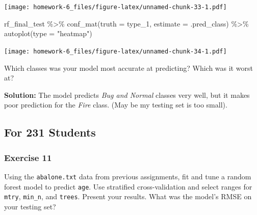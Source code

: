 \documentclass[
]{article}
\newenvironment{Shaded}{\begin{snugshade}}{\end{snugshade}}
\newcommand{\AttributeTok}[1]{\textcolor[rgb]{0.77,0.63,0.00}{#1}}
\newcommand{\FunctionTok}[1]{\textcolor[rgb]{0.00,0.00,0.00}{#1}}
\newcommand{\NormalTok}[1]{#1}
\newcommand{\SpecialCharTok}[1]{\textcolor[rgb]{0.00,0.00,0.00}{#1}}
\newcommand{\StringTok}[1]{\textcolor[rgb]{0.31,0.60,0.02}{#1}}
\begin{document}
\texttt{[image: homework-6\_files/figure-latex/unnamed-chunk-33-1.pdf]}

\begin{Shaded}
\begin{Highlighting}[]
\NormalTok{rf\_final\_test }\SpecialCharTok{\%\textgreater{}\%}
\FunctionTok{conf\_mat}\NormalTok{(}\AttributeTok{truth =}\NormalTok{ type\_1, }\AttributeTok{estimate =}\NormalTok{ .pred\_class) }\SpecialCharTok{\%\textgreater{}\%}
\FunctionTok{autoplot}\NormalTok{(}\AttributeTok{type =} \StringTok{"heatmap"}\NormalTok{)}
\end{Highlighting}
\end{Shaded}

\texttt{[image: homework-6\_files/figure-latex/unnamed-chunk-34-1.pdf]}

Which classes was your model most accurate at predicting? Which was it
worst at?

\textbf{Solution: } The model predicts \emph{Bug and Normal} classes
very well, but it makes poor prediction for the \emph{Fire} class. (May
be my testing set is too small).

\hypertarget{for-231-students}{%
\subsection{For 231 Students}\label{for-231-students}}

\hypertarget{exercise-11}{%
\subsubsection{Exercise 11}\label{exercise-11}}

Using the \texttt{abalone.txt} data from previous assignments, fit and
tune a random forest model to predict \texttt{age}. Use stratified
cross-validation and select ranges for \texttt{mtry}, \texttt{min\_n},
and \texttt{trees}. Present your results. What was the model's RMSE on
your testing set?
\end{document}
